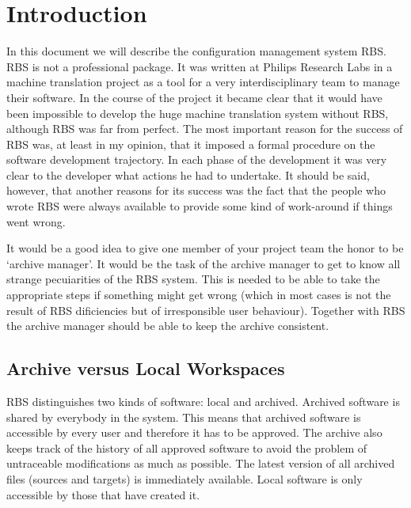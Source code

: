 
\parindent 0cm
\tableofcontents
\section{Introduction}
In this document we will describe the configuration management system RBS. RBS
is not a professional package. It was written at Philips Research Labs in a
machine translation project as a tool for a very interdisciplinary team to
manage their software. In the course of the project it
became clear that it would have been impossible to develop the huge machine
translation system without RBS, although RBS was far from perfect. The most
important reason for the success of RBS was, at least in my opinion, that it
imposed a formal procedure on the software development trajectory. In each
phase of the development it was very clear to the developer what actions he had
to undertake. It should be said, however, that another reasons for its success
was the fact that the people who wrote RBS were always available to provide some
kind of work-around if things went wrong.

It would be a good idea  to give one member of your project team the honor
to be `archive manager'. It would be the task of the archive manager to get to know
all strange pecuiarities of the RBS system. This is needed to be able to
take the appropriate steps if something might get wrong (which in most cases
is not the result of RBS dificiencies but of irresponsible user behaviour).
Together with RBS the archive manager should be able to keep the archive
consistent.  

\subsection{Archive versus Local Workspaces}
RBS distinguishes two kinds of software: local and archived. Archived software
is shared by everybody in the system. This means that archived software is
accessible by every user and therefore it has to be approved. The archive also 
keeps track of the history of all approved software to avoid the problem
of untraceable modifications as much as possible. The latest version of all
archived files (sources and targets) is immediately available. Local software
is only accessible by those that have created it. 

